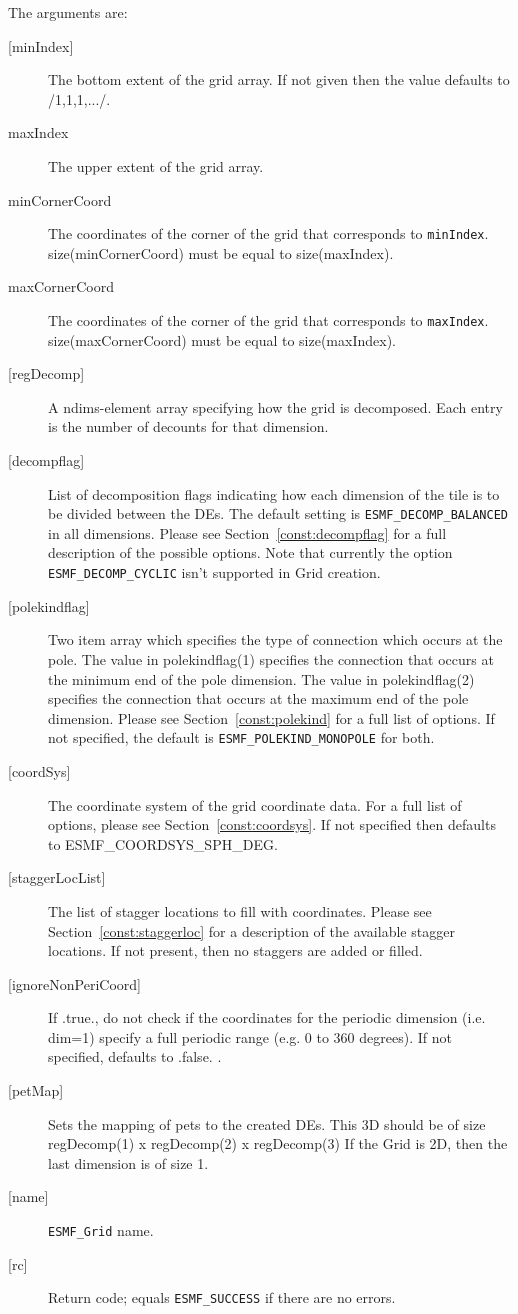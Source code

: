    The arguments are:
   \begin{description}
   \item[{[minIndex]}]
        The bottom extent of the grid array. If not given then the value defaults
        to /1,1,1,.../.
   \item[maxIndex]
        The upper extent of the grid array.
   \item[minCornerCoord]
        The coordinates of the corner of the grid that corresponds to {\tt minIndex}.
        size(minCornerCoord) must be equal to size(maxIndex).
   \item[maxCornerCoord]
        The coordinates of the corner of the grid that corresponds to {\tt maxIndex}.
        size(maxCornerCoord) must be equal to size(maxIndex).
   \item[{[regDecomp]}]
        A ndims-element array specifying how the grid is decomposed.
        Each entry is the number of decounts for that dimension.
   \item[{[decompflag]}]
        List of decomposition flags indicating how each dimension of the
        tile is to be divided between the DEs. The default setting
        is {\tt ESMF\_DECOMP\_BALANCED} in all dimensions. Please see
        Section~\ref{const:decompflag} for a full description of the
        possible options. Note that currently the option
        {\tt ESMF\_DECOMP\_CYCLIC} isn't supported in Grid creation.
   \item[{[polekindflag]}]
        Two item array which specifies the type of connection which occurs at the pole. The value in polekindflag(1)
        specifies the connection that occurs at the minimum end of the pole dimension. The value in polekindflag(2)
        specifies the connection that occurs at the maximum end of the pole dimension. Please see
        Section~\ref{const:polekind} for a full list of options. If not specified,
        the default is {\tt ESMF\_POLEKIND\_MONOPOLE} for both.
   \item[{[coordSys]}]
       The coordinate system of the grid coordinate data.
       For a full list of options, please see Section~\ref{const:coordsys}.
       If not specified then defaults to ESMF\_COORDSYS\_SPH\_DEG.
   \item[{[staggerLocList]}]
       The list of stagger locations to fill with coordinates. Please see Section~\ref{const:staggerloc}
       for a description of the available stagger locations. If not present, then
       no staggers are added or filled.
   \item[{[ignoreNonPeriCoord]}]
       If .true., do not check if the coordinates for the periodic dimension (i.e. dim=1) specify a full periodic range (e.g. 0 to 360 degrees).
       If not specified, defaults to .false. .
   \item[{[petMap]}]
         Sets the mapping of pets to the created DEs. This 3D
         should be of size regDecomp(1) x regDecomp(2) x regDecomp(3)
         If the Grid is 2D, then the last dimension is of size 1.
   \item[{[name]}]
        {\tt ESMF\_Grid} name.
   \item[{[rc]}]
        Return code; equals {\tt ESMF\_SUCCESS} if there are no errors.
   \end{description}
